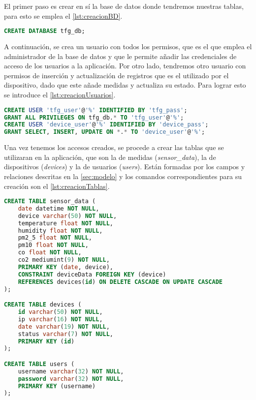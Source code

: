 El primer paso es crear en sí la base de datos donde tendremos nuestras tablas, para esto se emplea el \autoref{lst:creacionBD}.
\begin{lstlisting}[language=SQL, caption=Creación de la base de datos,label=lst:creacionBD]
CREATE DATABASE tfg_db;
\end{lstlisting}

A continuación, se crea un usuario con todos los permisos, que es el que emplea el administrador de la base de datos y que le permite añadir las credenciales de acceso de los usuarios a la aplicación. Por otro lado, tendremos otro usuario con permisos de inserción y actualización de registros que es el utilizado por el dispositivo, dado que este añade medidas y actualiza su estado. Para lograr esto se introduce el \autoref{lst:creacionUsuarios}.
\begin{lstlisting}[language=SQL, caption=Creación de usuarios de la base de datos, label=lst:creacionUsuarios]
CREATE USER 'tfg_user'@'%' IDENTIFIED BY 'tfg_pass';
GRANT ALL PRIVILEGES ON tfg_db.* TO 'tfg_user'@'%';
CREATE USER 'device_user'@'%' IDENTIFIED BY 'device_pass';
GRANT SELECT, INSERT, UPDATE ON *.* TO 'device_user'@'%';
\end{lstlisting}

Una vez tenemos los accesos creados, se procede a crear las tablas que se utilizaran en la aplicación, que son la de medidas (\textit{sensor\_data}), la de dispositivos (\textit{devices}) y la de usuarios (\textit{users}). Están formadas por los campos y relaciones descritas en la \autoref{sec:modelo} y los comandos correspondientes para su creación son el \autoref{lst:creacionTablas}.
\begin{lstlisting}[language=SQL, caption=Creación de tablas de la base de datos, label=lst:creacionTablas]
CREATE TABLE sensor_data (
    date datetime NOT NULL,
    device varchar(50) NOT NULL,
    temperature float NOT NULL,
    humidity float NOT NULL,
    pm2_5 float NOT NULL,
    pm10 float NOT NULL,
    co float NOT NULL,
    co2 mediumint(9) NOT NULL,
    PRIMARY KEY (date, device),
    CONSTRAINT deviceData FOREIGN KEY (device) 
    REFERENCES devices(id) ON DELETE CASCADE ON UPDATE CASCADE
);

CREATE TABLE devices (
    id varchar(50) NOT NULL,
    ip varchar(16) NOT NULL,
    date varchar(19) NOT NULL,
    status varchar(7) NOT NULL,
    PRIMARY KEY (id)
);

CREATE TABLE users (
    username varchar(32) NOT NULL,
    password varchar(32) NOT NULL,
    PRIMARY KEY (username)
);
\end{lstlisting}


